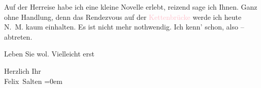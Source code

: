 \pstart
           Auf der Herreise habe ich eine kleine Novelle erlebt, reizend sage {\pb}ich Ihnen. Ganz ohne Handlung,
               denn das Rendezvous auf der \textcolor{pink}{Kettenbrücke}{}\ledrightnote{\textcolor{pink}{Kettenbrücke}} werde
               ich heute N. M. kaum einhalten. Es ist nicht mehr nothwendig. Ich kenn’
                  \label{K_L03108-2v}\label{K_L03108-2h} schon, also –
               abtreten.\pend
           
\pstart
           Leben Sie wol. Vielleicht erst \label{K_L03108-3v}\label{K_L03108-3h}\pend
           
\pstart
           Herzlich Ihr {\\[\baselineskip]}\spacefill\mbox{Felix Salten}\pend
           \leftskip=0em{}\endnumbering{}  
      